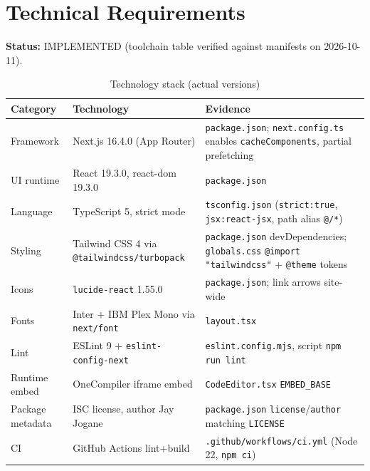 \section{Technical Requirements}
\label{sec:technical-requirements}

\textbf{Status:} IMPLEMENTED (toolchain table verified against manifests on 2026-10-11).

\begin{table}[H]
\centering
\caption{Technology stack (actual versions)}
\begin{tabular}{|l|l|p{6cm}|}
\hline
\textbf{Category} & \textbf{Technology} & \textbf{Evidence} \\ \hline
Framework & Next.js 16.4.0 (App Router) & \texttt{package.json}; \texttt{next.config.ts} enables \texttt{cacheComponents}, partial prefetching \\ \hline
UI runtime & React 19.3.0, react-dom 19.3.0 & \texttt{package.json} \\ \hline
Language & TypeScript 5, strict mode & \texttt{tsconfig.json} (\texttt{strict:true}, \texttt{jsx:react-jsx}, path alias \texttt{@/*}) \\ \hline
Styling & Tailwind CSS 4 via \texttt{@tailwindcss/turbopack} & \texttt{package.json} devDependencies; \texttt{globals.css} \texttt{@import "tailwindcss"} + \texttt{@theme} tokens \\ \hline
Icons & \texttt{lucide-react} 1.55.0 & \texttt{package.json}; link arrows site-wide \\ \hline
Fonts & Inter + IBM Plex Mono via \texttt{next/font} & \texttt{layout.tsx} \\ \hline
Lint & ESLint 9 + \texttt{eslint-config-next} & \texttt{eslint.config.mjs}, script \texttt{npm run lint} \\ \hline
Runtime embed & OneCompiler iframe embed & \texttt{CodeEditor.tsx} \texttt{EMBED\_BASE} \\ \hline
Package metadata & ISC license, author Jay Jogane & \texttt{package.json} \texttt{license}/\texttt{author} matching \texttt{LICENSE} \\ \hline
CI & GitHub Actions lint+build & \texttt{.github/workflows/ci.yml} (Node 22, \texttt{npm ci}) \\ \hline
\end{tabular}
\end{table}

